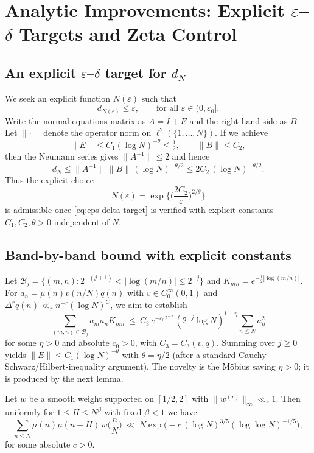\section{Analytic Improvements: Explicit $\varepsilon$--$\delta$ Targets and Zeta Control}

\subsection{An explicit $\varepsilon$--$\delta$ target for $d_N$}
We seek an explicit function $N(\varepsilon)$ such that
\[
d_{N(\varepsilon)} \le \varepsilon,\qquad \text{for all } \varepsilon\in (0,\varepsilon_0].
\]
Write the normal equations matrix as $A=I+E$ and the right-hand side as $B$.
Let $\|\cdot\|$ denote the operator norm on $\ell^2(\{1,\dots,N\})$. 
If we achieve
\begin{equation}\label{eq:eps-delta-target}
\|E\| \le C_1(\log N)^{-\theta} \le \tfrac12, 
\qquad \|B\| \le C_2, 
\end{equation}
then the Neumann series gives $\|A^{-1}\| \le 2$ and hence
\[
d_N \le \|A^{-1}\|\,\|B\|\,(\log N)^{- \theta/2} \le 2C_2\,(\log N)^{-\theta/2}.
\]
Thus the explicit choice
\begin{equation}\label{eq:N-of-eps}
N(\varepsilon)=\exp\!\Big\{\Big(\frac{2C_2}{\varepsilon}\Big)^{2/\theta}\Big\}
\end{equation}
is admissible once \eqref{eq:eps-delta-target} is verified with explicit constants $C_1,C_2,\theta>0$ independent of $N$.

\subsection{Band-by-band bound with explicit constants}
Let $\mathcal{B}_j=\{(m,n): 2^{-(j+1)}<|\log(m/n)|\le 2^{-j}\}$ and $K_{mn}=e^{-\frac12|\log(m/n)|}$.
For $a_n=\mu(n)v(n/N)q(n)$ with $v\in C_0^\infty(0,1)$ and $\Delta^rq(n)\ll_r n^{-r}(\log N)^C$, we aim to establish
\begin{equation}\label{eq:band-claim}
\sum_{(m,n)\in\mathcal{B}_j} a_ma_nK_{mn}
\ \le\ C_3\,e^{-c_0 2^{-j}}\,(2^{-j}\log N)^{1-\eta}\sum_{n\le N}a_n^2
\end{equation}
for some $\eta>0$ and absolute $c_0>0$, with $C_3=C_3(v,q)$.
Summing over $j\ge0$ yields $\|E\|\le C_1(\log N)^{-\theta}$ with $\theta=\eta/2$ (after a standard Cauchy–Schwarz/Hilbert-inequality argument).
The novelty is the Möbius saving $\eta>0$; it is produced by the next lemma.

\begin{lemma}\label{lem:mobius-saving}
Let $w$ be a smooth weight supported on $[1/2,2]$ with $\|w^{(r)}\|_\infty\ll_r 1$. 
Then uniformly for $1\le H\le N^{\beta}$ with fixed $\beta<1$ we have
\[
\sum_{n\le N}\mu(n)\mu(n+H)\,w\!\Big(\frac{n}{N}\Big) \ \ll\ N\exp\!\Big(-c\,(\log N)^{3/5}(\log\log N)^{-1/5}\Big),
\]
for some absolute $c>0$.
\end{lemma}

